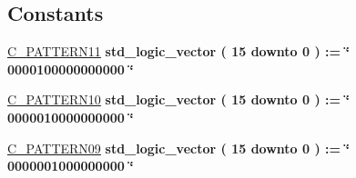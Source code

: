 \subsection*{Constants}
 \begin{DoxyCompactItemize}
\item 
\hyperlink{classalu_1_1rtl_ad4963a8ad145ee016be36a97fe2c8f2d}{C\+\_\+\+P\+A\+T\+T\+E\+R\+N11} {\bfseries \textcolor{comment}{std\+\_\+logic\+\_\+vector}\textcolor{vhdlchar}{ }\textcolor{vhdlchar}{(}\textcolor{vhdlchar}{ }\textcolor{vhdlchar}{ } \textcolor{vhdldigit}{15} \textcolor{vhdlchar}{ }\textcolor{keywordflow}{downto}\textcolor{vhdlchar}{ }\textcolor{vhdlchar}{ } \textcolor{vhdldigit}{0} \textcolor{vhdlchar}{ }\textcolor{vhdlchar}{)}\textcolor{vhdlchar}{ }\textcolor{vhdlchar}{ }\textcolor{vhdlchar}{ }\textcolor{vhdlchar}{\+:}\textcolor{vhdlchar}{=}\textcolor{vhdlchar}{ }\textcolor{vhdlchar}{ }\textcolor{vhdlchar}{ }\textcolor{vhdlchar}{ }\textcolor{keyword}{\char`\"{} 0000100000000000 \char`\"{}}\textcolor{vhdlchar}{ }} 
\item 
\hyperlink{classalu_1_1rtl_a24e0427bbe7b83699a97c1e3a0819dfb}{C\+\_\+\+P\+A\+T\+T\+E\+R\+N10} {\bfseries \textcolor{comment}{std\+\_\+logic\+\_\+vector}\textcolor{vhdlchar}{ }\textcolor{vhdlchar}{(}\textcolor{vhdlchar}{ }\textcolor{vhdlchar}{ } \textcolor{vhdldigit}{15} \textcolor{vhdlchar}{ }\textcolor{keywordflow}{downto}\textcolor{vhdlchar}{ }\textcolor{vhdlchar}{ } \textcolor{vhdldigit}{0} \textcolor{vhdlchar}{ }\textcolor{vhdlchar}{)}\textcolor{vhdlchar}{ }\textcolor{vhdlchar}{ }\textcolor{vhdlchar}{ }\textcolor{vhdlchar}{\+:}\textcolor{vhdlchar}{=}\textcolor{vhdlchar}{ }\textcolor{vhdlchar}{ }\textcolor{vhdlchar}{ }\textcolor{vhdlchar}{ }\textcolor{keyword}{\char`\"{} 0000010000000000 \char`\"{}}\textcolor{vhdlchar}{ }} 
\item 
\hyperlink{classalu_1_1rtl_a84e8ab2833b2c2b836491bc460efe9a3}{C\+\_\+\+P\+A\+T\+T\+E\+R\+N09} {\bfseries \textcolor{comment}{std\+\_\+logic\+\_\+vector}\textcolor{vhdlchar}{ }\textcolor{vhdlchar}{(}\textcolor{vhdlchar}{ }\textcolor{vhdlchar}{ } \textcolor{vhdldigit}{15} \textcolor{vhdlchar}{ }\textcolor{keywordflow}{downto}\textcolor{vhdlchar}{ }\textcolor{vhdlchar}{ } \textcolor{vhdldigit}{0} \textcolor{vhdlchar}{ }\textcolor{vhdlchar}{)}\textcolor{vhdlchar}{ }\textcolor{vhdlchar}{ }\textcolor{vhdlchar}{ }\textcolor{vhdlchar}{\+:}\textcolor{vhdlchar}{=}\textcolor{vhdlchar}{ }\textcolor{vhdlchar}{ }\textcolor{vhdlchar}{ }\textcolor{vhdlchar}{ }\textcolor{keyword}{\char`\"{} 0000001000000000 \char`\"{}}\textcolor{vhdlchar}{ }} 

\end{DoxyCompactItemize}
